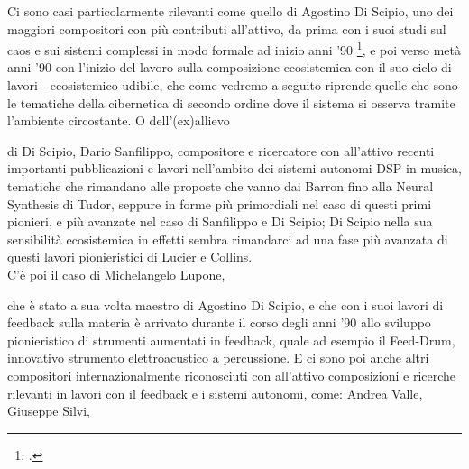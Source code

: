 Ci sono casi particolarmente rilevanti come quello di Agostino Di Scipio,
uno dei maggiori compositori con più contributi all'attivo,
da prima con i suoi studi sul caos e sui sistemi complessi in modo formale ad inizio
anni '90 \footcite{discipioiterated},
e poi verso metà anni '90 con l'inizio del lavoro sulla composizione ecosistemica
con il suo ciclo di lavori
- ecosistemico udibile, che come vedremo a seguito riprende
quelle che sono le tematiche della cibernetica di secondo ordine dove
il sistema si osserva tramite l'ambiente circostante.
O dell'(ex)allievo 


di Di Scipio, Dario Sanfilippo,
compositore e ricercatore con all'attivo recenti importanti pubblicazioni e lavori
nell'ambito dei sistemi autonomi DSP in musica, tematiche che rimandano
alle proposte che vanno dai Barron fino alla Neural Synthesis di Tudor,
seppure in forme più primordiali nel caso di questi primi pionieri, 
e più avanzate nel caso di Sanfilippo e Di Scipio;
Di Scipio nella sua sensibilità ecosistemica in effetti sembra rimandarci ad 
una fase più avanzata di questi
lavori pionieristici di Lucier e Collins. \\
C'è poi il caso di Michelangelo Lupone, 


che è stato a sua volta maestro
di Agostino Di Scipio,
e che con i suoi lavori di feedback sulla materia è arrivato durante il corso degli
anni '90 allo sviluppo
pionieristico di strumenti aumentati in feedback, quale ad esempio il Feed-Drum,
innovativo strumento elettroacustico a percussione.
E ci sono poi anche altri compositori internazionalmente riconosciuti
con all'attivo composizioni e ricerche rilevanti in lavori con il feedback
e i sistemi autonomi, come: Andrea Valle, Giuseppe Silvi,


